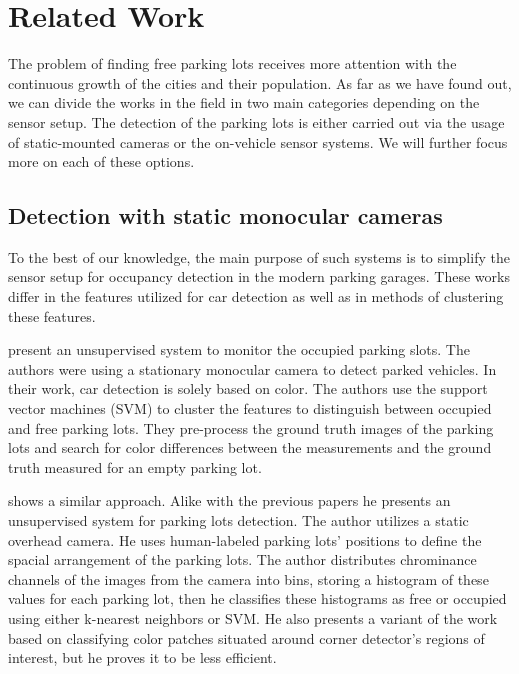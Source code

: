 \chapter{Related Work}
\label{cha:related_works}

The problem of finding free parking lots receives more attention with the
continuous growth of the cities and their population. As far as we have found
out, we can divide the works in the field in two main categories depending on
the sensor setup. The detection of the parking lots is either carried out via
the usage of static-mounted cameras or the on-vehicle sensor systems. We will
further focus more on each of these options.

\section{Detection with static monocular cameras} %
\label{sec:detection_with_monocular_cameras}

To the best of our knowledge, the main purpose of such systems is to simplify
the sensor setup for occupancy detection in the modern parking garages. These
works differ in the features utilized for car detection as well as in methods
of clustering these features.

\citet{qizhang06} present an unsupervised system to monitor the occupied
parking slots. The authors were using a stationary monocular camera to detect
parked vehicles. In their work, car detection is solely based on color. The
authors use the support vector machines (SVM) to cluster the features to
distinguish between occupied and free parking lots. They pre-process the
ground truth images of the parking lots and search for color differences
between the measurements and the ground truth measured for an empty parking
lot.

\citet{nicolastrue} shows a similar approach. Alike with the previous papers
he presents an unsupervised system for parking lots detection. The author
utilizes a static overhead camera. He uses human-labeled parking lots'
positions to define the spacial arrangement of the parking lots. The author
distributes chrominance channels of the images from the camera into bins,
storing a histogram of these values for each parking lot, then he classifies
these histograms as free or occupied using either k-nearest neighbors or
SVM\@. He also presents a variant of the work based on classifying color
patches situated around corner detector's regions of interest, but he proves
it to be less efficient.

